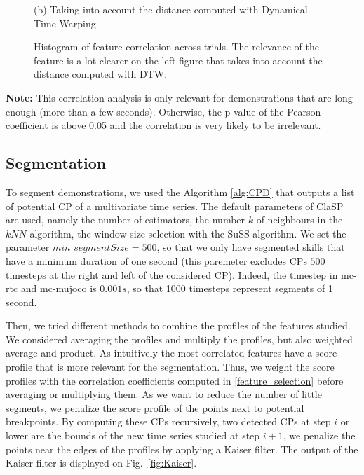 \documentclass[conference]{IEEEtran}
\begin{document}
\begin{figure}[ht]
\begin{minipage}[b]{0.47\linewidth}
    \caption*{(b) Taking into account the  distance computed with Dynamical Time Warping}
  \end{minipage}

\caption{Histogram of feature correlation across trials. The relevance of the feature is a lot clearer on the left figure that takes into account the distance computed with DTW.}
  \label{fig:histcorr}
\end{figure}

\textbf{Note:} This correlation analysis is only relevant for demonstrations that are long enough (more than a few seconds). Otherwise, the p-value of the Pearson coefficient \cite{pearson} is above 0.05 and the correlation is very likely to be irrelevant.

\subsection{Segmentation} \label{method_segmentation}

To segment demonstrations, we used the  Algorithm \ref{alg:CPD} that outputs a list  of potential CP of a multivariate time series. The default parameters of  ClaSP are used, namely the  number of estimators, the number $k$ of neighbours in the $kNN$ algorithm, the window size selection with the  SuSS algorithm. We set the parameter $min\_segmentSize = 500$, so that we only have segmented skills that have a minimum duration of one second (this paremeter excludes CPs $500$ timesteps at the right and left of the considered CP). Indeed, the timestep in mc-rtc and mc-mujoco \cite{singh2023mc} is $0.001s$, so that 1000 timesteps represent segments of 1 second. 

Then, we tried different methods to combine the profiles of the features studied. We considered averaging the profiles and multiply the profiles, but also weighted average and product. As intuitively the most correlated features have a score profile that is more relevant for the segmentation. Thus, we weight the score profiles with the correlation coefficients computed in \ref{feature_selection} before averaging or multiplying them. As we want to reduce the number of little segments, we penalize the score profile of the points next to potential breakpoints. By computing these CPs recursively, two detected CPs at step $i$ or lower are the bounds of the new time series studied at step $i+1$, we penalize the points near the edges of the profiles by applying a Kaiser filter. The output of the Kaiser filter is displayed on Fig.~\ref{fig:Kaiser}.
\end{document}
